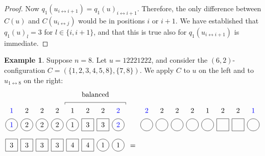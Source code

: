 \documentclass[reqno]{amsart}
\newcommand{\0}{\phantom{c}}
\theoremstyle{plain}
\theoremstyle{definition}
\newtheorem{example}[thm]{Example}
\numberwithin{equation}{section}
\begin{document}
\begin{proof}
  Now $q_1(u_{i\leftrightarrow i+1}) = q_1(u)_{i\leftrightarrow i+1}$. Therefore, the only difference between $C(u)$ and $C(u_{i\leftrightarrow j})$ would be in positions $i$ or $i+1$. We have established that $q_1(u)_l = 3$ for $l \in \{i,i+1\}$, and that this is true also for $q_1(u_{i\leftrightarrow i+1})$ is immediate.
\end{proof}

\begin{example}
Suppose $n = 8$.
Let $u = 12221222$, and consider the $(6,2)$-configuration $C = (\{1,2,3,4,5,8\}, \{7,8\})$.
We apply $C$ to $u$ on the left and to $u_{1 \leftrightarrow 8}$ on the right:
\[
\begin{tikzpicture}[baseline=25]
  \def\sc{0.75}   %
  \def\lll{2.7}   %
  \def\ll{2}   %
  \def\l{1}   %
  \node[color=blue] at (1*\sc,\lll) {$1$};
  \node[color=blue] at (8*\sc,\lll) {$2$};
  \foreach \i in {5} { \node at (\i*\sc,\lll){$1$}; }
  \foreach \i in {2,3,4,6,7} { \node at (\i*\sc,\lll){$2$}; }
  \foreach \i in {1,2,3,4,5,8} { \draw (\i*\sc,\ll) circle (0.3); }
  \foreach \i in {6,7} { \draw (\i*\sc-.3,\ll-.3) rectangle +(0.6,+0.6); }
  \node[color=blue] at (1*\sc,\ll) {$1$};
  \node[color=blue] at (8*\sc,\ll) {$2$};
  \foreach \i in {5} { \node at (\i*\sc,\ll) {$1$}; }
  \foreach \i in {2,3,4} { \node at (\i*\sc,\ll) {$2$}; }
  \foreach \i in {6,7} { \node at (\i*\sc,\ll) {$3$}; }
  \foreach \i in {7,8} { \draw (\i*\sc,\l) circle (0.3); }
  \foreach \i in {1,2,3,4,5,6} { \draw (\i*\sc-.3,\l-.3) rectangle +(0.6,+0.6); }
  \foreach \i in {5,6} { \node at (\i*\sc,\l) {$4$}; }
  \foreach \i in {7,8} { \node at (\i*\sc,\l) {$1$}; }
  \foreach \i in {1,2,3,4} { \node at (\i*\sc,\l) {$3$}; }
  \draw (4.5*\sc,3) -- (4.5*\sc,3.1) -- (8.5*\sc,3.1) -- (8.5*\sc,3);
  \node at (6.5*\sc,3.5) {balanced};
\end{tikzpicture}
\hspace{3pt} = \hspace{4pt}
\begin{tikzpicture}[baseline=25]
  \def\sc{0.75}   %
  \def\lll{2.7}   %
  \def\ll{2}   %
  \def\l{1}   %
  \node[color=blue] at (8*\sc,\lll) {$1$};
  \node[color=blue] at (1*\sc,\lll) {$2$};
  \foreach \i in {5} { \node at (\i*\sc,\lll){$1$}; }
  \foreach \i in {2,3,4,6,7} { \node at (\i*\sc,\lll){$2$}; }
  \foreach \i in {1,2,3,4,5,8} { \draw (\i*\sc,\ll) circle (0.3); }
  \foreach \i in {6,7} { \draw (\i*\sc-.3,\ll-.3) rectangle +(0.6,+0.6); }

\end{tikzpicture}\]
\end{example}
\end{document}
